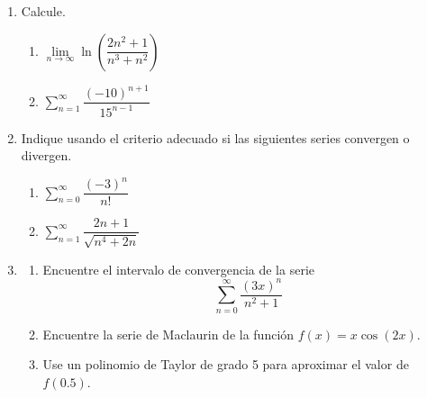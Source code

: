 \begin{frame}%
  \begin{enumerate}
    \item Calcule.
      \begin{enumerate}
        \item $\lim\limits_{n\to\infty}\ln\left(\dfrac{2n^2+1}{n^3+n^2}\right)$
        \item $\displaystyle\sum_{n=1}^{\infty}\dfrac{(-10)^{n+1}}{15^{n-1}}$
      \end{enumerate}
    \vspace{2mm}
    \item Indique usando el criterio adecuado si las siguientes series convergen o divergen.
      \begin{enumerate}
        \item $\displaystyle\sum_{n=0}^{\infty}\dfrac{(-3)^n}{n!}$
        \item $\displaystyle\sum_{n=1}^{\infty}\dfrac{2n+1}{\sqrt{n^4+2n}}$
      \end{enumerate}
    \vspace{2mm}
    \item 
      \begin{enumerate}
        \item Encuentre el intervalo de convergencia de la serie 
          $$\displaystyle\sum_{n=0}^{\infty}\dfrac{(3x)^n}{n^2+1}$$
        \item Encuentre la serie de Maclaurin de la función $f(x)=x\cos(2x)$.
        \item Use un polinomio de Taylor de grado 5 para aproximar el valor de $f(0.5)$.
      \end{enumerate}
  \end{enumerate}
\end{frame}


